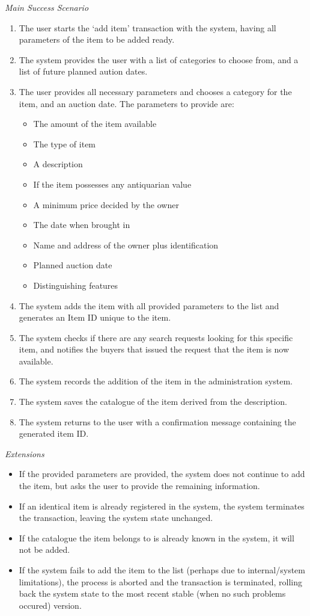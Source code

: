 \textsl{Main Success Scenario}
\begin{enumerate}[noitemsep]
	\item The user starts the `add item' transaction with the system, having all parameters of the item to be added ready.
	\item The system provides the user with a list of categories to choose from, and a list of future planned aution dates.
	\item The user provides all necessary parameters and chooses a category for the item, and an auction date. The parameters to provide are:
	\begin{itemize}[noitemsep]
		\item The amount of the item available
		\item The type of item
		\item A description
		\item If the item possesses any antiquarian value
		\item A minimum price decided by the owner
		\item The date when brought in
		\item Name and address of the owner plus identification
		\item Planned auction date
		\item Distinguishing features
	\end{itemize}
	\item The system adds the item with all provided parameters to the list and generates an Item ID unique to the item.
	\item The system checks if there are any search requests looking for this specific item, and notifies the buyers that issued the request that the item is now available.
	\item The system records the addition of the item in the administration system.
	\item The system saves the catalogue of the item derived from the description.
	\item The system returns to the user with a confirmation message containing the generated item ID.
\end{enumerate}
\textsl{Extensions}
\begin{itemize}[noitemsep]
	\item If the provided parameters are provided, the system does not continue to add the item, but asks the user to provide the remaining information.
	\item If an identical item is already registered in the system, the system terminates the transaction, leaving the system state unchanged.
	\item If the catalogue the item belongs to is already known in the system, it will not be added.
	\item If the system fails to add the item to the list (perhaps due to internal/system limitations), the process is aborted and the transaction is terminated, rolling back the system state to the most recent stable (when no such problems occured) version.
\end{itemize}
